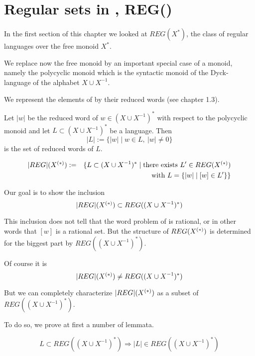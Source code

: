 \section{Regular sets in , REG()}

In the first section of this chapter we looked at $REG(X^*)$, the class of
regular languages over the free monoid $X^*$. 

We replace now the free monoid by an important special case of a monoid, namely
the polycyclic monoid  which is the syntactic monoid of the
Dyck-language of the alphabet $X \cup X^{-1}$.

We represent the elements of  by their reduced words (see chapter
1.3).

\begin{definition}
Let $|w|$ be the reduced word of $w \in (X \cup X^{-1})^*$ with respect to the
polycyclic monoid  and let $L \subset (X \cup X^{-1})^*$ be a
language. Then
\[ |L| := \{ |w| \mid w \in L,\ |w| \neq 0 \} \]
is the set of reduced words of $L$.
\end{definition}

\begin{definition}
\begin{eqnarray*}
|REG|(\mbox{${X}^{(*)}$}) & := & \{ L \subset (X\cup X^{-1})^* \mid \mbox{there exists
}L' \in REG(\mbox{${X}^{(*)}$}) \\
& & \mbox{ with } L = \{|w| \mid [w] \in L' \} \}
\end{eqnarray*}
\end{definition}

Our goal is to show the inclusion
\[ |REG|(\mbox{${X}^{(*)}$}) \subset REG((X \cup X^{-1})^*) \]

This inclusion does not tell that the word problem of  is rational,
or in other words that $[w]$ is a rational set. But the structure of
$REG(\mbox{${X}^{(*)}$})$ is determined for the biggest part by $REG((X \cup
X^{-1})^*)$.

Of course it is
\[ |REG|(\mbox{${X}^{(*)}$}) \neq REG((X \cup X^{-1})^*) \]

But we can completely characterize $|REG|(\mbox{${X}^{(*)}$})$ as a subset of $REG((X
\cup X^{-1})^*)$.

To do so, we prove at first a number of lemmata.

\begin{lemma}
\[ L \subset REG((X \cup X^{-1})^*) \Rightarrow |L| \in REG((X \cup X^{-1})^*)
\]
\end{lemma}

